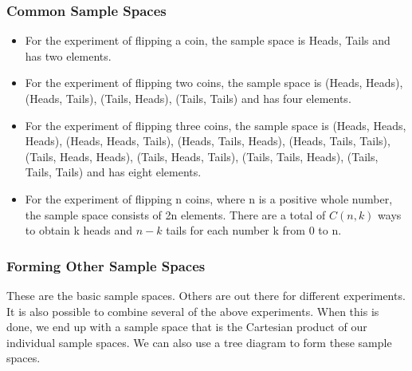 \documentclass[IntroMain.tex]{subfiles}
\begin{document}
\begin{frame}
	\frametitle{Common Sample Spaces}	
	\begin{itemize}
		\item For the experiment of flipping a coin, the sample space is {Heads, Tails} and has two elements.
		
		\item For the experiment of flipping two coins, the sample space is {(Heads, Heads), (Heads, Tails), (Tails, Heads), (Tails, Tails) } and has four elements.
		
		\item For the experiment of flipping three coins, the sample space is {(Heads, Heads, Heads), (Heads, Heads, Tails), (Heads, Tails, Heads), (Heads, Tails, Tails), (Tails, Heads, Heads), (Tails, Heads, Tails), (Tails, Tails, Heads), (Tails, Tails, Tails) } and has eight elements.
		
		\item For the experiment of flipping n coins, where n is a positive whole number, the sample space consists of 2n elements. There are a total of $C(n, k)$ ways to obtain k heads and $n - k$ tails for each number k from 0 to n.
		
	\end{itemize}
\end{frame}
\begin{frame}
	\frametitle{Forming Other Sample Spaces}
	
	These are the basic sample spaces. Others are out there for different experiments. It is also possible to combine several of the above experiments. When this is done, we end up with a sample space that is the Cartesian product of our individual sample spaces. We can also use a tree diagram to form these sample spaces.
	
	
\end{frame}
\end{document}
